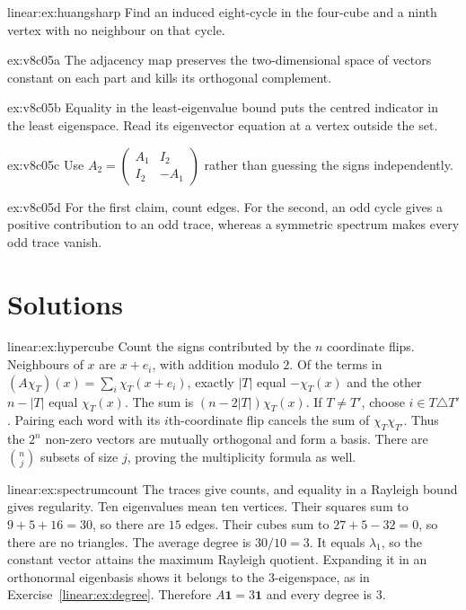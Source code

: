 \begin{hint}{linear:ex:huangsharp}
Find an induced eight-cycle in the four-cube and a ninth vertex with no neighbour on that cycle.
\end{hint}
\begin{hint}{ex:v8c05a}
The adjacency map preserves the two-dimensional space of vectors constant on each part and kills its orthogonal complement.
\end{hint}
\begin{hint}{ex:v8c05b}
Equality in the least-eigenvalue bound puts the centred indicator in the least eigenspace. Read its eigenvector equation at a vertex outside the set.
\end{hint}
\begin{hint}{ex:v8c05c}
Use $A_2=\begin{pmatrix}A_1&I_2\\I_2&-A_1\end{pmatrix}$ rather than guessing the signs independently.
\end{hint}
\begin{hint}{ex:v8c05d}
For the first claim, count edges. For the second, an odd cycle gives a positive contribution to an odd trace, whereas a symmetric spectrum makes every odd trace vanish.
\end{hint}

\section{Solutions}

\begin{solution}{linear:ex:hypercube}
\idea Count the signs contributed by the $n$ coordinate flips.
\writeup Neighbours of $x$ are $x+e_i$, with addition modulo $2$. Of the terms in $(A\chi_T)(x)=\sum_i\chi_T(x+e_i)$, exactly $|T|$ equal $-\chi_T(x)$ and the other $n-|T|$ equal $\chi_T(x)$. The sum is $(n-2|T|)\chi_T(x)$.
If $T\ne T'$, choose $i\in T\triangle T'$. Pairing each word with its $i$th-coordinate flip cancels the sum of $\chi_T\chi_{T'}$. Thus the $2^n$ non-zero vectors are mutually orthogonal and form a basis. There are $\binom nj$ subsets of size $j$, proving the multiplicity formula as well.
\end{solution}

\begin{solution}{linear:ex:spectrumcount}
\idea The traces give counts, and equality in a Rayleigh bound gives regularity.
\writeup Ten eigenvalues mean ten vertices. Their squares sum to $9+5+16=30$, so there are $15$ edges. Their cubes sum to $27+5-32=0$, so there are no triangles. The average degree is $30/10=3$. It equals $\lambda_1$, so the constant vector attains the maximum Rayleigh quotient. Expanding it in an orthonormal eigenbasis shows it belongs to the $3$-eigenspace, as in Exercise~\ref{linear:ex:degree}. Therefore $A\mathbf1=3\mathbf1$ and every degree is $3$.
\end{solution}

